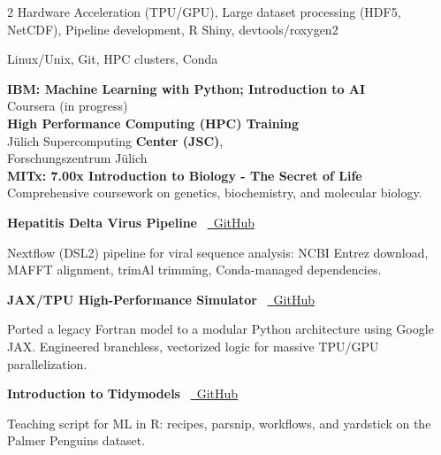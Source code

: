 \documentclass{thejus_cv}
\begin{document}
\begin{paracol}{2}
         {Hardware Acceleration (TPU/GPU), Large dataset processing (HDF5, NetCDF), Pipeline development, R Shiny, devtools/roxygen2}

         {Linux/Unix, Git, HPC clusters, Conda}



\textbf{IBM: Machine Learning with Python; Introduction to AI}\\
{\small Coursera (in progress)}\\[0.3cm]

\textbf{High Performance Computing (HPC) Training}\\
J\"ulich Supercomputing \textbf{Center (JSC)},\\
Forschungszentrum J\"ulich\\[0.3cm]

\textbf{MITx: 7.00x Introduction to Biology - The Secret of Life}\\
{\small Comprehensive coursework on genetics, biochemistry, and molecular biology.}\\[0.4cm]


\textbf{Hepatitis Delta Virus Pipeline} \textbullet\ \href{https://github.com/thejusmahajan/hepatitis-delta-pipeline}{\faGithub\ GitHub}\par
{\small Nextflow (DSL2) pipeline for viral sequence analysis: NCBI Entrez download, MAFFT alignment, trimAl trimming, Conda-managed dependencies.}\par
\vspace{0.3em}

\textbf{JAX/TPU High-Performance Simulator} \textbullet\ \href{https://github.com/thejusmahajan/Agent_Based_Phytoplankton_Model-IBM-Phytoplankton}{\faGithub\ GitHub}\par
{\small Ported a legacy Fortran model to a modular Python architecture using Google JAX. Engineered branchless, vectorized logic for massive TPU/GPU parallelization.}\par
\vspace{0.3em}

\textbf{Introduction to Tidymodels} \textbullet\ \href{https://github.com/thejusmahajan/Introduction_to_Tidymodels}{\faGithub\ GitHub}\par
{\small Teaching script for ML in R: recipes, parsnip, workflows, and yardstick on the Palmer Penguins dataset.}\par
\vspace{0.3em}


\end{paracol}
\end{document}
